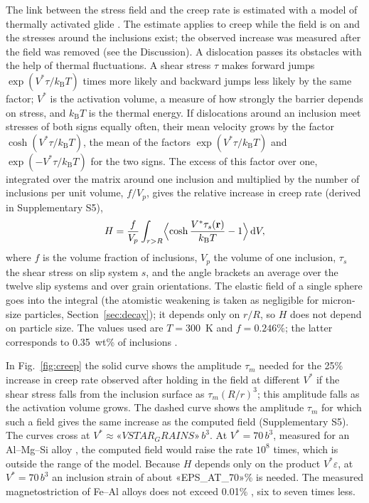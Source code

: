 \documentclass[11pt,a4paper]{article}
\begin{document}
The link between the stress field and the creep rate is estimated with a model
of thermally activated glide \cite{KocksArgonAshby1975,CaillardMartin2003}.
The estimate applies to creep while the field is on and the stresses around
the inclusions exist; the observed increase was measured after the field was
removed (see the Discussion).
A dislocation passes its obstacles with the help of thermal fluctuations. A
shear stress $\tau$ makes forward jumps $\exp(V^*\tau/k_{\mathrm B}T)$ times
more likely and backward jumps less likely by the same factor; $V^*$ is the
activation volume, a measure of how strongly the barrier depends on stress,
and $k_{\mathrm B}T$ is the thermal energy. If dislocations around an
inclusion meet stresses of both signs equally often, their mean velocity grows
by the factor $\cosh(V^*\tau/k_{\mathrm B}T)$, the mean of the factors
$\exp(V^*\tau/k_{\mathrm B}T)$ and $\exp(-V^*\tau/k_{\mathrm B}T)$ for the two
signs. The excess of this factor over one, integrated over the matrix around
one inclusion and multiplied by the number of inclusions per unit volume,
$f/V_p$, gives the relative increase in creep rate (derived in
Supplementary S5),
\begin{equation}
H=\frac{f}{V_p}\int_{r>R}
\Bigl\langle\cosh\frac{V^*\tau_s(\mathbf r)}{k_{\mathrm B}T}-1\Bigr\rangle
\,\mathrm dV ,
\label{eq:creep}
\end{equation}
where $f$ is the volume fraction of inclusions, $V_p$ the volume of one
inclusion, $\tau_s$ the shear stress on slip system $s$, and the angle
brackets an average over the twelve slip systems and over grain orientations.
The elastic field of a single sphere goes into the integral (the atomistic
weakening is taken as negligible for micron-size particles,
Section~\ref{sec:decay}); it depends only
on $r/R$, so $H$ does not depend on particle size. The values used are
$T=300$~K and $f=0.246\%$; the latter corresponds to 0.35~wt\% of inclusions
\cite{Friha2024JMMM}.

In Fig.~\ref{fig:creep} the solid curve shows the amplitude $\tau_m$ needed for
the 25\% increase in creep rate observed after holding in the field
\cite{Skvortsov2019JAP} at different $V^*$ if the shear stress
falls from the inclusion surface as $\tau_m(R/r)^3$; this amplitude falls as
the activation volume grows. The dashed curve shows the amplitude $\tau_m$ for
which such a field gives the same increase as the computed field
(Supplementary S5). The curves cross at $V^*\approx«VSTAR_GRAINS»\,b^3$. At $V^*=70\,b^3$, measured for
an Al--Mg--Si alloy \cite{Soula2022JALCOM}, the computed field would raise the
rate $10^8$ times, which is outside the range of the model. Because $H$ depends only on the
product $V^*\varepsilon$, at $V^*=70\,b^3$ an inclusion strain of about
«EPS_AT_70»\% is needed. The measured magnetostriction of Fe--Al alloys does not
exceed 0.01\% \cite{Hall1959,BormioNunes2012}, six to seven times less.
\end{document}
